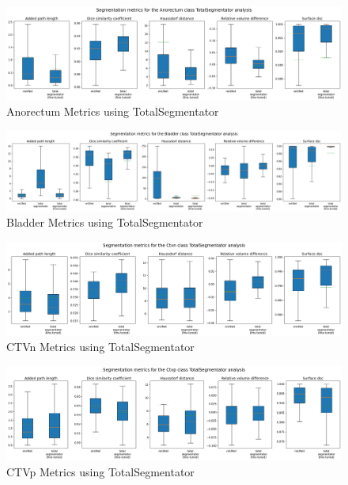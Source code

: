\documentclass[11pt,twoside]{report}
\begin{document}
\begin{landscape}

  \begin{figure}[H]
    \centering
    \includegraphics[width=\linewidth]{../../research/source/code/data/metrics/metricsanorectum_1_combinednotable_TotalSegmentator_analysis.png}
    \caption{Anorectum Metrics using TotalSegmentator}\label{fig:totalsegmentator-metrics-anorectum}
  \end{figure}

  \begin{figure}[H]
    \centering
    \includegraphics[width=\linewidth]{../../research/source/code/data/metrics/metricsbladder_1_combinednotable_TotalSegmentator_analysis.png}
    \caption{Bladder Metrics using TotalSegmentator}\label{fig:totalsegmentator-metrics-bladder}
  \end{figure}

  \begin{figure}[H]
    \centering
    \includegraphics[width=\linewidth]{../../research/source/code/data/metrics/metricsctvn_1_combinednotable_TotalSegmentator_analysis.png}
    \caption{CTVn Metrics using TotalSegmentator}\label{fig:totalsegmentator-metrics-ctvn}
  \end{figure}

  \begin{figure}[H]
    \centering
    \includegraphics[width=\linewidth]{../../research/source/code/data/metrics/metricsctvp_1_combinednotable_TotalSegmentator_analysis.png}
    \caption{CTVp Metrics using TotalSegmentator}\label{fig:totalsegmentator-metrics-ctvp}
  \end{figure}


\end{landscape}
\end{document}
